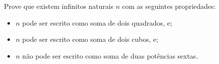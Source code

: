 Prove que existem infinitos naturais $n$ com as seguintes propriedades:
\begin{itemize}
	\item $n$ pode ser escrito como soma de dois quadrados, e;
	\item $n$ pode ser escrito como soma de dois cubos, e;
	\item $n$ não pode ser escrito como soma de duas potências sextas.
\end{itemize}
